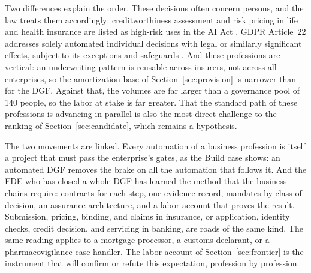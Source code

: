 Two differences explain the order. These decisions often concern persons, and the law treats them
accordingly: creditworthiness assessment and risk pricing in life and health insurance are listed as
high-risk uses in the AI Act \citep[Annex~III]{aiact}. GDPR Article~22 addresses solely automated
individual decisions with legal or similarly significant effects, subject to its exceptions and
safeguards \citep{gdpr}. And these professions are vertical: an underwriting
pattern is reusable across insurers, not across all enterprises, so the amortization base of
Section~\ref{sec:provision} is narrower than for the DGF. Against that, the volumes are far larger than
a governance pool of 140 people, so the labor at stake is far greater. That the standard path of these
professions is advancing in parallel is also the most direct challenge to the ranking of
Section~\ref{sec:candidate}, which remains a hypothesis.

The two movements are linked. Every automation of a business profession is itself a project that must
pass the enterprise's gates, as the Build case shows: an automated DGF removes the brake on all the
automation that follows it. And the FDE who has closed a whole DGF has learned the method that the
business chains require: contracts for each step, one evidence record, mandates by class of decision,
an assurance architecture, and a labor account that proves the result. Submission, pricing, binding,
and claims in insurance, or application, identity checks, credit decision, and servicing in banking,
are roads of the same kind. The same reading applies to a mortgage processor, a customs declarant, or a
pharmacovigilance case handler. The labor
account of Section~\ref{sec:frontier} is the instrument that will confirm or refute this expectation,
profession by profession.
